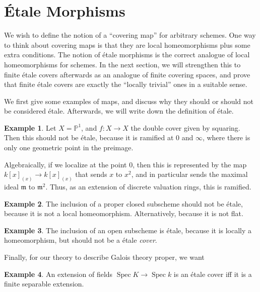 \documentclass{shortart}
\theoremstyle{definition}
\newtheorem*{eg}{Example}
\renewcommand\P{\mathbb{P}}
\DeclareMathOperator\Spec{Spec}
\begin{document}
\section{\'Etale Morphisms}
We wish to define the notion of a ``covering map'' for arbitrary schemes. One way to think about covering maps is that they are local homeomorphisms plus some extra conditions. The notion of \'etale morphisms is the correct analogue of local homeomorphisms for schemes. In the next section, we will strengthen this to finite \'etale covers afterwards as an analogue of finite covering spaces, and prove that finite \'etale covers are exactly the ``locally trivial'' ones in a suitable sense.

We first give some examples of maps, and discuss why they should or should not be considered \'etale. Afterwards, we will write down the definition of \'etale.
\begin{eg}
  Let $X = \P^1$, and $f: X \to X$ the double cover given by squaring. Then this should not be \'etale, because it is ramified at $0$ and $\infty$, where there is only one geometric point in the preimage.
  
  Algebraically, if we localize at the point $0$, then this is represented by the map $k[x]_{(x)} \to k[x]_{(x)}$ that sends $x$ to $x^2$, and in particular sends the maximal ideal $\mathfrak{m}$ to $\mathfrak{m}^2$. Thus, as an extension of discrete valuation rings, this is ramified.
\end{eg}

\begin{eg}
  The inclusion of a proper closed subscheme should not be \'etale, because it is not a local homeomorphism. Alternatively, because it is not flat.
\end{eg}

\begin{eg}
  The inclusion of an open subscheme is \'etale, because it is locally a homeomorphism, but should not be a \'etale \emph{cover}.
\end{eg}

Finally, for our theory to describe Galois theory proper, we want
\begin{eg}
  An extension of fields $\Spec K \to \Spec k$ is an \'etale cover iff it is a finite separable extension.
\end{eg}
\end{document}
